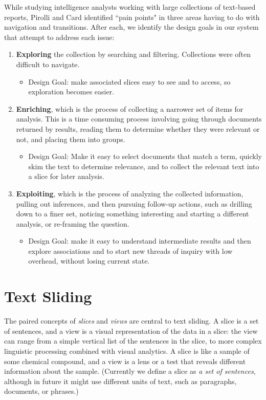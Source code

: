 \documentclass{sig-alternate}
\newcommand{\strong}[1] {\textbf{#1}}
\begin{document}
While studying intelligence analysts working with large collections of text-based reports, Pirolli and Card \cite{pirolli_sensemaking_2005} identified ``pain points" in three areas having to do with navigation and transitions. After each, we identify the design goals in our system that attempt to address each issue:
\begin{enumerate}
\item \strong{Exploring} the collection by searching and filtering. Collections were often difficult to navigate. 
	\begin{itemize}
		\item Design Goal: make associated slices  easy to see and to access, so exploration  becomes easier. 
	\end{itemize}
\item \strong{Enriching}, which is the process of collecting a narrower set of items for analysis. This is a time consuming process involving going through documents returned by results, reading them to determine whether they were relevant or not, and placing them into groups.
	\begin{itemize}
		\item Design Goal: Make it easy to select documents that match a term, quickly skim the text to determine relevance, and to collect the relevant text into a slice for later analysis.
	\end{itemize}
\item \strong{Exploiting}, which is the process of analyzing the collected information, pulling out inferences, and then pursuing  follow-up actions, such as drilling down to a finer set, noticing something interesting and starting a different analysis, or re-framing the question.
	\begin{itemize}
		\item Design Goal: make it easy to understand intermediate results and then explore associations and to start new threads of inquiry with low overhead,  without losing current state.
	\end{itemize}
\end{enumerate}


\section{Text Sliding}

The paired concepts of \emph{slices} and \emph{views} are central to text sliding. A slice is a set of sentences, and a view is a visual representation of the data in a slice: the view can range from a simple vertical list of the sentences in the slice, to more complex linguistic processing combined with visual analytics.  A slice is like a sample of some chemical compound,  and a view is a lens or a test that reveals different information about the sample. (Currently we define a slice as \emph{a set of sentences}, although in future it might use different units of text, such as paragraphs, documents, or phrases.) 
\end{document}

